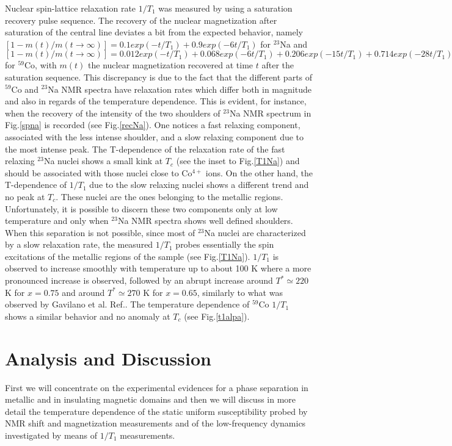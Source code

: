 \documentclass[prb,showpacs,preprintnumbers,amsmath,amssymb,floatfix]{revtex4}
\begin{document}
Nuclear spin-lattice relaxation rate $1/T_1$ was measured by using
a saturation recovery pulse sequence. The recovery of the nuclear
magnetization after saturation of the central line deviates a bit
from the expected behavior, namely $[1-m(t)/m(t\rightarrow\infty
)]= 0.1 exp(-t/T_1) + 0.9 exp(-6t/T_1)$ for $^{23}$Na and
$[1-m(t)/m(t\rightarrow\infty )]= 0.012 exp(-t/T_1) + 0.068
exp(-6t/T_1) + 0.206 exp(-15t/T_1) + 0.714 exp(-28t/T_1)$ for
$^{59}$Co, with $m(t)$ the nuclear magnetization recovered at time
$t$ after the saturation sequence. This discrepancy is due to the
fact that the different parts of $^{59}$Co and $^{23}$Na NMR
spectra have relaxation rates which differ both in magnitude and
also in regards of the temperature dependence. This is evident,
for instance, when the recovery of the intensity of the two
shoulders of $^{23}$Na NMR spectrum in Fig.\ref{spna} is recorded
(see Fig.\ref{recNa}). One notices a fast relaxing component,
associated with the less intense shoulder, and a slow relaxing
component due to the most intense peak. The T-dependence of the
relaxation rate of the fast relaxing $^{23}$Na nuclei shows a
small kink at $T_c$ (see the inset to Fig.\ref{T1Na}) and should
be associated with those nuclei close to Co$^{4+}$ ions. On the
other hand, the T-dependence of $1/T_1$ due to the slow relaxing
nuclei shows a different trend and no peak at $T_c$. These nuclei
are the ones belonging to the metallic regions. Unfortunately, it
is possible to discern these two components only at low
temperature and only when $^{23}$Na NMR spectra shows well defined
shoulders. When this separation is not possible, since most of
$^{23}$Na nuclei are characterized by a slow relaxation rate, the
measured $1/T_1$ probes essentially the spin excitations of the
metallic regions of the sample (see Fig.\ref{T1Na}). $1/T_1$ is
observed to increase smoothly with temperature up to about 100 K
where a more pronounced increase is observed, followed by an
abrupt increase around $T^*\simeq 220$ K for $x=0.75$ and around
$T^*\simeq 270$ K for $x=0.65$, similarly to what was observed by
Gavilano et al. Ref.. The temperature
dependence of $^{59}$Co $1/T_1$ shows a similar behavior and no
anomaly at $T_c$ (see Fig.\ref{t1alpa}).


\section{Analysis and Discussion}

First we will concentrate on the experimental evidences for a
phase separation in metallic and in insulating magnetic domains
and then we will discuss in more detail the temperature dependence
of the static uniform susceptibility  probed by NMR shift and
magnetization measurements and of the low-frequency dynamics
investigated by means of $1/T_1$ measurements.
\end{document}
